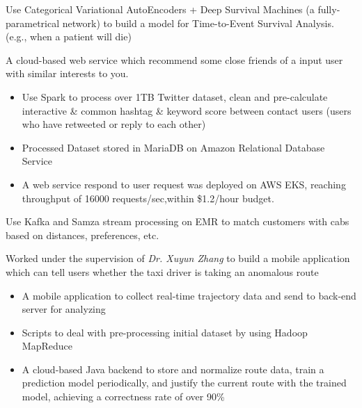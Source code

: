 \documentclass{resume}
\begin{document}
\begin{flushleft}
Use Categorical Variational AutoEncoders + Deep Survival Machines (a fully-parametrical network) to build a model for Time-to-Event Survival Analysis. (e.g., when a patient will die)

A cloud-based web service which recommend some close friends of a input user with similar interests to you.
\begin{itemize}
    \item Use Spark to process over 1TB Twitter dataset, clean and pre-calculate interactive \& common hashtag \linebreak \& keyword score between contact users (users who have retweeted or reply to each other)
    \item Processed Dataset stored in MariaDB on Amazon Relational Database Service
    \item A web service respond to user request was deployed on AWS EKS, reaching throughput of 16000 requests/sec,\linebreak within \$1.2/hour budget.
\end{itemize}


Use Kafka and Samza stream processing on EMR to match customers with cabs based on distances, preferences, etc.

Worked under the supervision of \textit{Dr. Xuyun Zhang} to build a mobile application which can tell users whether \linebreak the taxi driver is taking an anomalous route
\begin{itemize}
    \item A mobile application to collect real-time trajectory data and send to back-end server for analyzing
    \item Scripts to deal with pre-processing initial dataset by using Hadoop MapReduce
    \item A cloud-based Java backend to store and normalize route data, train a prediction model periodically, \linebreak and justify the current route with the trained model, achieving a correctness rate of over 90\%
\end{itemize}
\end{flushleft}
\end{document}
